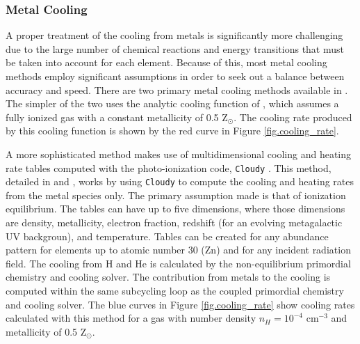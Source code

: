 \subsubsection{Metal Cooling}

A proper treatment of the cooling from metals is significantly more
challenging due to the large number of chemical reactions and energy
transitions that must be taken into account for each element.  Because
of this, most metal cooling methods employ significant assumptions in
order to seek out a balance between accuracy and speed.  There are two
primary metal cooling methods available in \enzo.  The simpler of the
two uses the analytic cooling function of \citet{SW87}, which assumes
a fully ionized gas with a constant metallicity of 0.5 Z$_{\odot}$.
The cooling rate produced by this cooling function is shown by the red 
curve in Figure \ref{fig.cooling_rate}.

A more sophisticated method makes use of multidimensional cooling and
heating rate tables computed with the photo-ionization code,
\texttt{Cloudy} \citep{1998PASP..110..761F}.  This method, detailed in
\citet{2008MNRAS.385.1443S} and \citet{2011ApJ...731....6S}, works by
using \texttt{Cloudy} to compute the cooling and heating rates from
the metal species only.  The primary assumption made is that of
ionization equilibrium.  The tables can have up to five dimensions,
where those dimensions are density, metallicity, electron fraction,
redshift (for an evolving metagalactic UV backgroun), and
temperature.  Tables can be created for any abundance pattern for
elements up to atomic number 30 (Zn) and for any incident radiation
field.  The cooling from H and He is calculated by the non-equilibrium
primordial chemistry and cooling solver.  The contribution from metals
to the cooling is computed within the same subcycling loop as the
coupled primordial chemistry and cooling solver.  The blue curves in
Figure \ref{fig.cooling_rate} show cooling rates calculated with this
method for a gas with number density $n_{H} = 10^{-4}$ cm$^{-3}$ and
metallicity of 0.5 Z$_{\odot}$.

